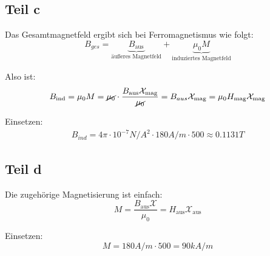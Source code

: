 \documentclass[a4paper,german,12pt,smallheadings]{scrartcl}
\begin{document}
\subsection*{Teil c}

Das Gesamtmagnetfeld ergibt sich bei Ferromagnetismus wie folgt:
\begin{equation*}
B_{ges}=\underbrace{B_{\text{aus}}}_{\text{äußeres Magnetfeld}}+\underbrace{\mu_0M}_{\text{induziertes Magnetfeld}}
\end{equation*}

Also ist:
\begin{align*}
B_{\text{ind}}=\mu_0M=\cancel{\mu_0} \cdot \frac{B_{\text{aus}} \mathcal{X}_{\text{mag}}}{\cancel{\mu_0}}=B_{aus}\mathcal{X}_{\text{mag}}=\mu_0H_{\text{mag}}\mathcal{X}_{\text{mag}}
\end{align*}

Einsetzen:
\begin{align*}
B_{ind}=4\pi \cdot 10^{-7} N/A^2 \cdot 180 A/m \cdot 500 \approx 0.1131T
\end{align*}

\subsection*{Teil d}

Die zugehörige Magnetisierung ist einfach:
\begin{equation*}
M=\frac{B_{\text{aus}}\mathcal{X}}{\mu_0}=H_{\text{aus}} \mathcal{X}_{\text{aus}}
\end{equation*}

Einsetzen:
\begin{equation*}
M=180A/m \cdot 500=90kA/m
\end{equation*}
\end{document}
